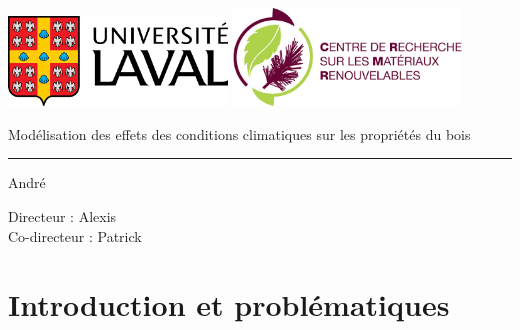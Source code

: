 \documentclass{report}
\date{Québec, le 19 avril 2018}
\begin{document}
	
	\begin{titlepage}
		\begin{center}
			
			\includegraphics[height=2.4cm]{logo_laval} \hspace{3.1cm}
			\includegraphics[height=2.6cm]{crmr_logo}
			
			\vspace{\fill}
			
			\begin{center}
				\Huge Modélisation des effets des conditions climatiques sur les propriétés du bois
			\end{center}
			
			\hrule height 1pt
			
			\begin{flushright}
				\Large André 
			\end{flushright}
			
			\vspace{\fill}
			
			\Large Directeur : Alexis  \\ Co-directeur : Patrick 

		\end{center}
	\end{titlepage}
	
	\tableofcontents
	\listoffigures
	


\chapter{Introduction et problématiques}
\end{document}
